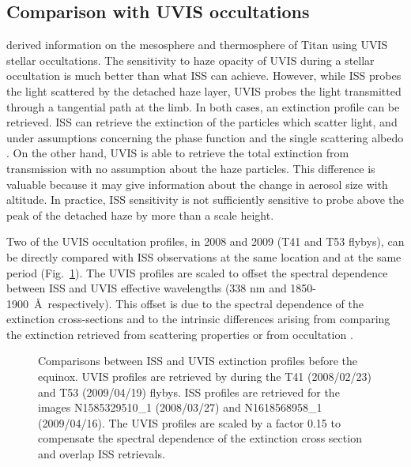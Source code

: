 \subsection{Comparison with UVIS occultations}

\cite{Koskinen2011} derived information on the mesosphere and thermosphere of Titan using UVIS stellar
occultations. The sensitivity to haze opacity of UVIS during a stellar occultation is much better than what ISS can achieve. However,
while ISS probes the light scattered by the detached haze layer, UVIS probes the light transmitted through a tangential
path at the limb. In both cases, an extinction profile can be retrieved. ISS can retrieve the extinction of the
particles which scatter light, and under assumptions concerning the phase function and the single scattering albedo .
On the other hand, UVIS is able to retrieve the total extinction from transmission with no assumption about the haze
particles. This difference is valuable because it may give information about the change in aerosol
size with altitude. In practice, ISS sensitivity is not sufficiently sensitive to probe above
the peak of the detached haze by more than a scale height.

Two of the UVIS occultation profiles, in 2008 and 2009 (T41 and T53 flybys), can be directly compared with ISS
observations at the same location and at the same period (Fig.~\ref{fig:uvis_iss}). The UVIS profiles are scaled to
offset the spectral dependence between ISS and UVIS effective wavelengths (338 nm and 1850-1900~\AA~respectively).
This offset is due to the spectral dependence of the extinction cross-sections and to the intrinsic
differences arising from comparing the extinction retrieved from scattering properties or from occultation
\citep[see.][]{Cours2011}.

\begin{figure}[!ht]
\caption{Comparisons between ISS and UVIS extinction profiles before the equinox.
UVIS profiles are retrieved by \cite{Koskinen2011} during the T41 (2008/02/23) and T53 (2009/04/19) flybys.
ISS profiles are retrieved for the images N1585329510\_1 (2008/03/27) and
N1618568958\_1 (2009/04/16).
The UVIS profiles are scaled by a factor 0.15 to compensate the spectral dependence of the extinction
cross section and overlap ISS retrievals.}
\label{fig:uvis_iss}
\end{figure}


